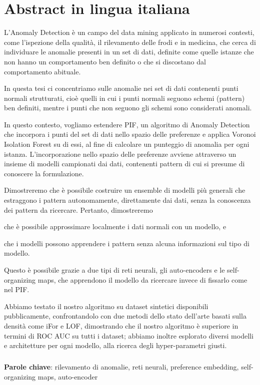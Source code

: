 \chapter*{Abstract in lingua italiana}
L'Anomaly Detection è un campo del data mining applicato in numerosi contesti, come l'ispezione della qualità, il rilevamento delle frodi e in medicina, che cerca di individuare le anomalie presenti in un set di dati, definite come quelle istanze che non hanno un comportamento ben definito o che si discostano dal comportamento abituale.

\hspace{5pt}
In questa tesi ci concentriamo sulle anomalie nei set di dati contenenti punti normali strutturati, cioè quelli in cui i punti normali seguono schemi (pattern) ben definiti, mentre i punti che non seguono gli schemi sono considerati anomali.

\hspace{5pt}
In questo contesto, vogliamo estendere PIF, un algoritmo di Anomaly Detection che incorpora i punti del set di dati nello spazio delle preferenze e applica Voronoi Isolation Forest su di essi, al fine di calcolare un punteggio di anomalia per ogni istanza. L'incorporazione nello spazio delle preferenze avviene attraverso un insieme di modelli campionati dai dati, contenenti pattern di cui si presume di conoscere la formulazione.

\hspace{5pt}
Dimostreremo che è possibile costruire un ensemble di modelli più generali che estraggono i pattern autonomamente, direttamente dai dati, senza la conoscenza dei pattern da ricercare. Pertanto, dimostreremo
\begin{enumerate*}[label=(\roman*)]
    \item che è possibile approssimare localmente i dati normali con un modello, e
    \item che i modelli possono apprendere i pattern senza alcuna informazioni sul tipo di modello.
\end{enumerate*}
Questo è possibile grazie a due tipi di reti neurali, gli auto-encoders e le self-organizing maps, che apprendono il modello da ricercare invece di fissarlo come nel PIF.

\hspace{5pt}
Abbiamo testato il nostro algoritmo su dataset sintetici disponibili pubblicamente, confrontandolo con due metodi dello stato dell'arte basati sulla densità come iFor e LOF, dimostrando che il nostro algoritmo è superiore in termini di ROC AUC su tutti i dataset; abbiamo inoltre esplorato diversi modelli e architetture per ogni modello, alla ricerca degli hyper-parametri giusti.

\paragraph{}
\textbf{Parole chiave}: rilevamento di anomalie, reti neurali, preference embedding, self-organizing maps, auto-encoder